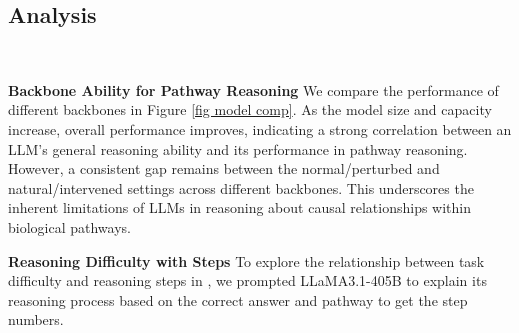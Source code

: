 \subsection{Analysis}



\begin{figure*}[!t]
    \centering    
    \renewcommand{\thesubfigure}{} %
     \\
    \vspace{-10mm}
    \vspace{-2mm}
    \caption{Comparison of the reasoning abilities of different LLMs for biological pathways. While overall performance improves with larger and more powerful models, a consistent gap exists between normal/perturbed and natural/intervened settings. This highlights the inherent limitations of LLMs in reasoning about the causal relationships within biological pathways.}
    \label{fig model comp}
    \vspace{-2mm}
\end{figure*}

\textbf{Backbone Ability for Pathway Reasoning} We compare the performance of different backbones in Figure \ref{fig model comp}. As the model size and capacity increase, overall performance improves, indicating a strong correlation between an LLM’s general reasoning ability and its performance in pathway reasoning. However, a consistent gap remains between the normal/perturbed and natural/intervened settings across different backbones. This underscores the inherent limitations of LLMs in reasoning about causal relationships within biological pathways.





\textbf{Reasoning Difficulty with Steps} To explore the relationship between task difficulty and reasoning steps in \benchname, we prompted LLaMA3.1-405B to explain its reasoning process based on the correct answer and pathway to get the step numbers.

